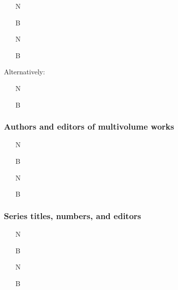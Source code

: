 \documentclass[11pt,letterpaper,oneside]{article}
\begin{document}
\begin{itemize}
\item[N] 

\item[B] 

\item[N] 

\item[B] 
\end{itemize}

\noindent Alternatively:

\begin{itemize}
\item[N] 

\item[B] 
\end{itemize}

\subsubsection{Authors and editors of multivolume works}
\label{14.127}

\begin{itemize}
\item[N] 

\item[B] 

\item[N] 

\item[B] 
\end{itemize}

\subsubsection{Series titles, numbers, and editors}
\label{14.128}

\begin{itemize}
\item[N] 

\item[B] 

\item[N] 

\item[B] 
\end{itemize}
\end{document}
